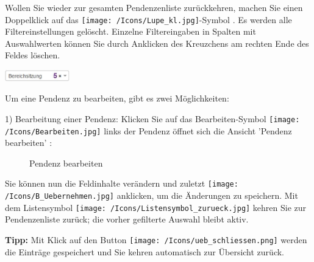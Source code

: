 Wollen Sie wieder zur gesamten Pendenzenliste zurückkehren, machen Sie einen Doppelklick auf das \texttt{[image: /Icons/Lupe\_kl.jpg]}-Symbol . Es werden alle Filtereinstellungen gelöscht. Einzelne Filtereingaben in Spalten mit Auswahlwerten können Sie durch Anklicken des Kreuzchens  am rechten Ende des Feldes löschen. 

\begin{center}
\includegraphics[height=14pt]{../chapters/05_Sitzungswesen/pictures/5-5_PendenzenFeldLoeschen.jpg}
\end{center}

Um eine Pendenz zu bearbeiten, gibt es zwei Möglichkeiten: 

\vspace{\baselineskip}

1) Bearbeitung einer Pendenz: Klicken Sie auf das Bearbeiten-Symbol \texttt{[image: /Icons/Bearbeiten.jpg]}  links der Pendenz öffnet sich die Ansicht 'Pendenz bearbeiten' :

\begin{figure}[H]
\caption{Pendenz bearbeiten}
\end{figure}

Sie können nun die Feldinhalte verändern und zuletzt \texttt{[image: /Icons/B\_Uebernehmen.jpg]} anklicken, um die Änderungen zu speichern. Mit dem Listensymbol \texttt{[image: /Icons/Listensymbol\_zurueck.jpg]}  kehren Sie zur Pendenzenliste zurück; die vorher gefilterte Auswahl bleibt aktiv.

\vspace{\baselineskip}

\textbf{Tipp:} Mit Klick auf den Button \texttt{[image: /Icons/ueb\_schliessen.png]} werden die Einträge gespeichert und Sie kehren automatisch zur Übersicht zurück.

\vspace{\baselineskip}

